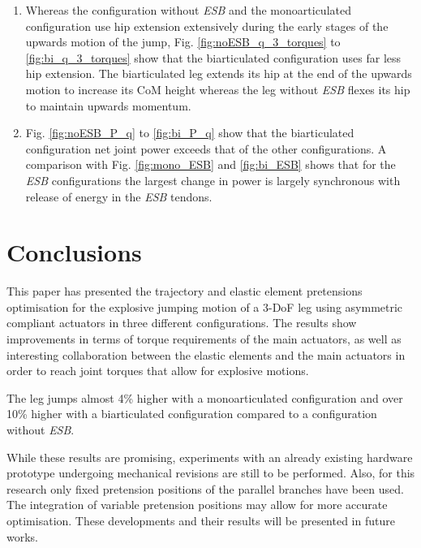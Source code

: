 \documentclass[letterpaper, 10 pt, conference]{ieeeconf}  %
\begin{document}
\begin{enumerate}
	\item Whereas the configuration without \textit{ESB} and the monoarticulated configuration use hip extension extensively during the early stages of the upwards motion of the jump, Fig. \ref{fig:noESB_q_3_torques} to \ref{fig:bi_q_3_torques} show that the biarticulated configuration uses far less hip extension. The biarticulated leg extends its hip at the end of the upwards motion to increase its CoM height whereas the leg without \textit{ESB} flexes its hip to maintain upwards momentum.
	
	\item Fig. \ref{fig:noESB_P_q} to \ref{fig:bi_P_q} show that the biarticulated configuration net joint power exceeds that of the other configurations. A comparison with Fig. \ref{fig:mono_ESB} and \ref{fig:bi_ESB} shows that for the \textit{ESB} configurations the largest change in power is largely synchronous with release of energy in the \textit{ESB} tendons.
	
\end{enumerate}


\section{Conclusions} \label{sec:conclusions} 
This paper has presented the trajectory and elastic element pretensions optimisation for the explosive jumping motion of a 3-DoF leg using asymmetric compliant actuators in three different configurations. The results show improvements in terms of torque requirements of the main actuators, as well as interesting collaboration between the elastic elements and the main actuators in order to reach joint torques that allow for explosive motions.

The leg jumps almost 4\% higher with a monoarticulated configuration and over 10\% higher with a biarticulated configuration compared to a configuration without \textit{ESB}.

While these results are promising, experiments with an already existing hardware prototype undergoing mechanical revisions are still to be performed. Also, for this research only fixed pretension positions of the parallel branches have been used. The integration of variable pretension positions may allow for more accurate optimisation. These developments and their results will be presented in future works.
\end{document}
